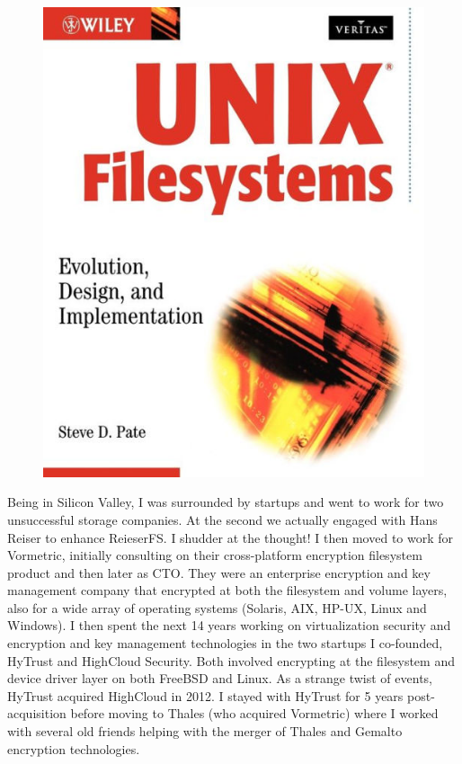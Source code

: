 \begin{figure}
	\centering
	\includegraphics[scale=0.8]{figures/book-2.jpg}
\end{figure}

Being in Silicon Valley, I was surrounded by startups and went to work for two unsuccessful storage companies. At the second we actually engaged with Hans Reiser to enhance ReieserFS. I shudder at the thought! I then moved to work for Vormetric, initially consulting on their cross-platform encryption filesystem product and then  later as CTO. They were an enterprise encryption and key management company that encrypted at both the filesystem and volume layers, also for a wide array of operating systems (Solaris, AIX, HP-UX, Linux and Windows). I then spent the next 14 years working on virtualization security and encryption and key management technologies in the two startups I co-founded, HyTrust and HighCloud Security. Both involved encrypting at the filesystem and device driver layer on both FreeBSD and Linux. As a strange twist of events, HyTrust acquired HighCloud in 2012. I stayed with HyTrust for 5 years post-acquisition before moving to Thales (who acquired Vormetric) where I worked with several old friends helping with the merger of Thales and Gemalto encryption technologies.

